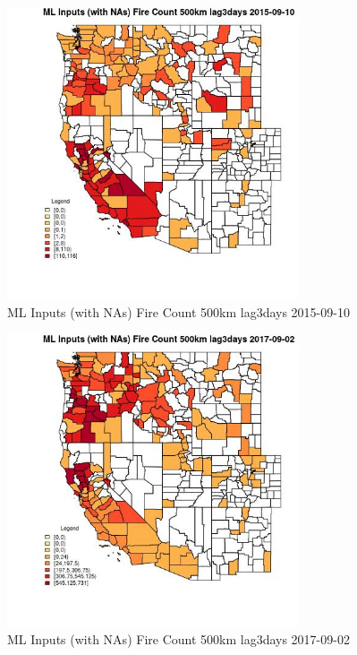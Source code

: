 \begin{figure} 
\centering  
\includegraphics[width=0.77\textwidth]{Code_Outputs/Report_ML_input_PM25_Step4_part_e_de_duplicated_aves_compiled_2019-05-21wNAs_CountyFire_Count_500km_lag3daysMean2015-09-10.jpg} 
\caption{\label{fig:Report_ML_input_PM25_Step4_part_e_de_duplicated_aves_compiled_2019-05-21wNAsCountyFire_Count_500km_lag3daysMean2015-09-10}ML Inputs (with NAs) Fire Count 500km lag3days 2015-09-10} 
\end{figure} 
 

\begin{figure} 
\centering  
\includegraphics[width=0.77\textwidth]{Code_Outputs/Report_ML_input_PM25_Step4_part_e_de_duplicated_aves_compiled_2019-05-21wNAs_CountyFire_Count_500km_lag3daysMean2017-09-02.jpg} 
\caption{\label{fig:Report_ML_input_PM25_Step4_part_e_de_duplicated_aves_compiled_2019-05-21wNAsCountyFire_Count_500km_lag3daysMean2017-09-02}ML Inputs (with NAs) Fire Count 500km lag3days 2017-09-02} 
\end{figure} 
 

